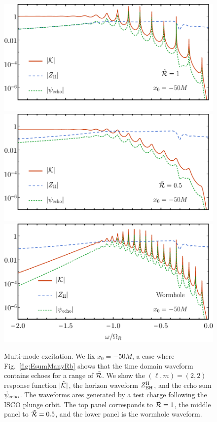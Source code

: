 \begin{refsection}
\begin{figure}[t]
\includegraphics[width = 1 \columnwidth]{chapter_echo/etc/R1multimodeplot.pdf}\\
\vspace{-14.75pt}
\includegraphics[width = 1 \columnwidth]{chapter_echo/etc/Rp5multimodeplot}\\
\vspace{-14.75pt}
\includegraphics[width = 1\columnwidth]{chapter_echo/etc/Rwormmultimodeplot}
\caption{
Multi-mode excitation. We fix $x_0=-50M$, a case where Fig.~\ref{fig:EsumManyRb} shows that the time domain waveform contains echoes for a range of $\tilde{\mathcal R}$. We show the $(\ell,m)=(2,2)$ response function $|\tilde{\mathcal K}|$, the horizon waveform $Z^{\rm H}_{\rm BH}$, and the echo sum $\tilde \psi_{\rm echo}$. The waveforms ares generated by a test charge following the ISCO plunge orbit. The top panel corresponds to $\tilde{\mathcal R}=1$, the middle panel to $\tilde{\mathcal R}=0.5$, and the lower panel is the wormhole waveform.
}
\label{fig:MultiECOModeFrequency}
\end{figure}


\end{refsection}

